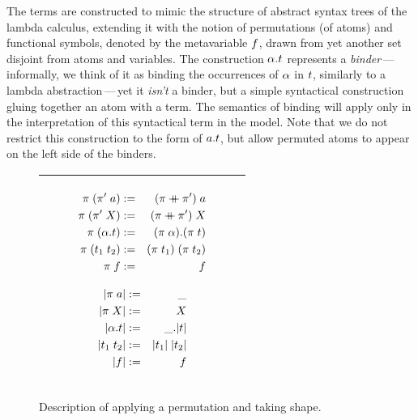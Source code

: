 \documentclass[english, mgr]{iithesis}
\renewcommand{\it}[1]{\textit{#1}}
\newcommand{\mdash}{\,---\,}
\def\-{{\mdash}}
\begin{document}
The terms are constructed to mimic the structure of abstract syntax trees of the lambda calculus,
extending it with the notion of permutations (of atoms) and functional symbols,
denoted by the metavariable $f$, drawn from yet another set disjoint from atoms and variables.
The construction $\alpha. t$ represents a \it{binder}\-informally, we think of it as binding the occurrences of $\alpha$ in $t$,
similarly to a lambda abstraction\-yet it \it{isn't} a binder,
but a simple syntactical construction gluing together an atom with a term.
The semantics of binding will apply only in the interpretation of this syntactical term in the model.
Note that we do not restrict this construction to the form of $a. t$, but allow permuted atoms to appear on the left side of the binders.

\begin{figure}[htbp]
  \centering
  \begin{tabularx}{\textwidth}{|C|}
    \hline
    \begin{subfigure}{0.45\textwidth}
      \begin{eqnarray*}
        \perm \apperm (\perm' \apperm \atomv)  & := & (\perm \++ \perm') \apperm \atomv \\
        \perm \apperm (\perm' \apperm \termv)  & := & (\perm \++ \perm') \apperm \termv \\
        \perm \apperm (\tbind{\atomexp} \term) & := & \tbind{(\perm \apperm \atomexp)} (\perm \apperm \term) \\
        \perm \apperm (\term_1 \tapp \term_2)  & := & (\perm \apperm \term_1) \tapp (\perm \apperm \term_2) \\
        \perm \apperm \symb                    & := & \symb \\
      \end{eqnarray*}
    \end{subfigure}
    \begin{subfigure}{0.45\textwidth}
      \begin{eqnarray*}
        |\pi \; a|   & := & \_ \\
        |\pi \; X|   & := & X  \\
        |\alpha. t| & := & \_. |t| \\
        |t_1 \; t_2|  & := & |t_1| \; |t_2| \\
        |f|                  & := & f \\
      \end{eqnarray*}
    \end{subfigure}
  \\ \hline
  \end{tabularx}
  \caption{Description of applying a permutation and taking shape.}
  \label{fig:permutation-shapes-interpretation}
\end{figure}
\end{document}
